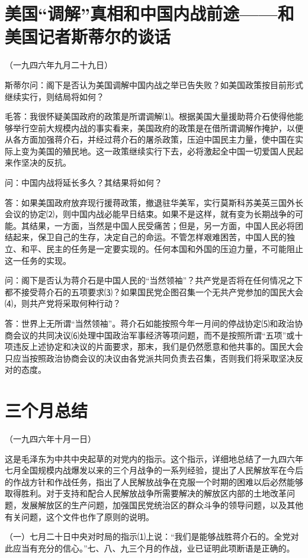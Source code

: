 \documentclass[UTF-8, a5paper, 12pt]{ctexart}
\begin{document}
\section{美国“调解”真相和中国内战前途——和美国记者斯蒂尔的谈话}

（一九四六年九月二十九日）

斯蒂尔问：阁下是否认为美国调解中国内战之举已告失败？如美国政策按目前形式继续实行，则结局将如何？

毛答：我很怀疑美国政府的政策是所谓调解⑴。根据美国大量援助蒋介石使得他能够举行空前大规模内战的事实看来，美国政府的政策是在借所谓调解作掩护，以便从各方面加强蒋介石，并经过蒋介石的屠杀政策，压迫中国民主力量，使中国在实际上变为美国的殖民地。这一政策继续实行下去，必将激起全中国一切爱国人民起来作坚决的反抗。

问：中国内战将延长多久？其结果将如何？

答：如果美国政府放弃现行援蒋政策，撤退驻华美军，实行莫斯科苏美英三国外长会议的协定⑵，则中国内战必能早日结束。如果不是这样，就有变为长期战争的可能。其结果，一方面，当然是中国人民受痛苦；但是，另一方面，中国人民必将团结起来，保卫自己的生存，决定自己的命运。不管怎样艰难困苦，中国人民的独立、和平、民主的任务是一定要实现的。任何本国和外国的压迫力量，不可能阻止这一任务的实现。

问：阁下是否认为蒋介石是中国人民的“当然领袖”？共产党是否将在任何情况之下都不接受蒋介石的五项要求⑶？如果国民党企图召集一个无共产党参加的国民大会⑷，则共产党将采取何种行动？

答：世界上无所谓“当然领袖”。蒋介石如能按照今年一月间的停战协定⑸和政治协商会议的共同决议⑹处理中国政治军事经济等项问题，而不是按照所谓“五项”或十项违反上述协定和决议的片面要求，那末，我们是仍然愿意和他共事的。国民大会只应当按照政治协商会议的决议由各党派共同负责去召集，否则我们将采取坚决反对的态度。


\section{三个月总结}


（一九四六年十月一日）

这是毛泽东为中共中央起草的对党内的指示。这个指示，详细地总结了一九四六年七月全国规模内战爆发以来的三个月战争的一系列经验，提出了人民解放军在今后的作战方针和作战任务，指出了人民解放战争在克服一个时期的困难以后必然能够取得胜利。对于支持和配合人民解放战争所需要解决的解放区内部的土地改革问题，发展解放区的生产问题，加强国民党统治区的群众斗争的领导问题，以及其他有关问题，这个文件也作了原则的说明。

（一）七月二十日中央对时局的指示⑴上说：“我们是能够战胜蒋介石的。全党对此应当有充分的信心。”七、八、九三个月的作战，业已证明此项断语是正确的。
\end{document}
